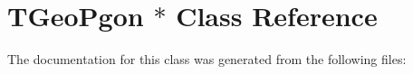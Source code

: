\hypertarget{class_t_geo_pgon_01_5}{}\section{T\+Geo\+Pgon $\ast$ Class Reference}
\label{class_t_geo_pgon_01_5}


The documentation for this class was generated from the following files\+: